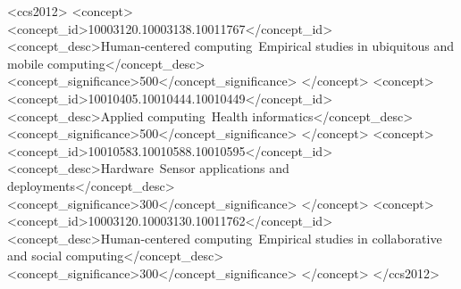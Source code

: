 
\begin{CCSXML}
<ccs2012>
   <concept>
       <concept_id>10003120.10003138.10011767</concept_id>
       <concept_desc>Human-centered computing~Empirical studies in ubiquitous and mobile computing</concept_desc>
       <concept_significance>500</concept_significance>
       </concept>
   <concept>
       <concept_id>10010405.10010444.10010449</concept_id>
       <concept_desc>Applied computing~Health informatics</concept_desc>
       <concept_significance>500</concept_significance>
       </concept>
   <concept>
       <concept_id>10010583.10010588.10010595</concept_id>
       <concept_desc>Hardware~Sensor applications and deployments</concept_desc>
       <concept_significance>300</concept_significance>
       </concept>
   <concept>
       <concept_id>10003120.10003130.10011762</concept_id>
       <concept_desc>Human-centered computing~Empirical studies in collaborative and social computing</concept_desc>
       <concept_significance>300</concept_significance>
       </concept>
 </ccs2012>
\end{CCSXML}



%


